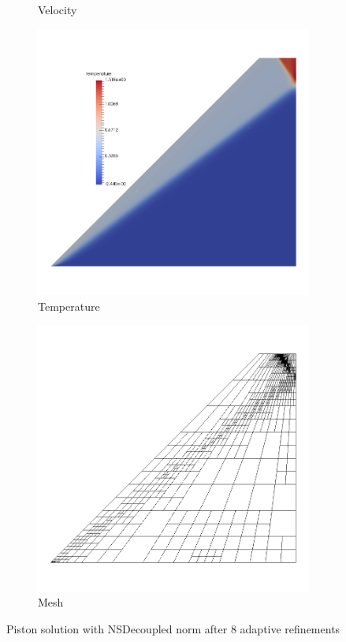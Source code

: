 \documentclass[Dissertation.tex]{subfiles}
\begin{document}
\begin{figure}[!ht]
\begin{subfigure}[t]{0.45\textwidth}
\caption{Velocity}
\end{subfigure}
\begin{subfigure}[t]{0.45\textwidth}
\centering
\includegraphics[width=\textwidth]{Piston/Piston_temp.png}
\caption{Temperature}
\end{subfigure}
\begin{subfigure}[t]{0.45\textwidth}
\centering
\includegraphics[width=\textwidth]{Piston/Piston_mesh.png}
\caption{Mesh}
\end{subfigure}
\caption{Piston solution with NSDecoupled norm after 8 adaptive refinements}
\label{fig:PistonSolution}
\end{figure}
\end{document}
